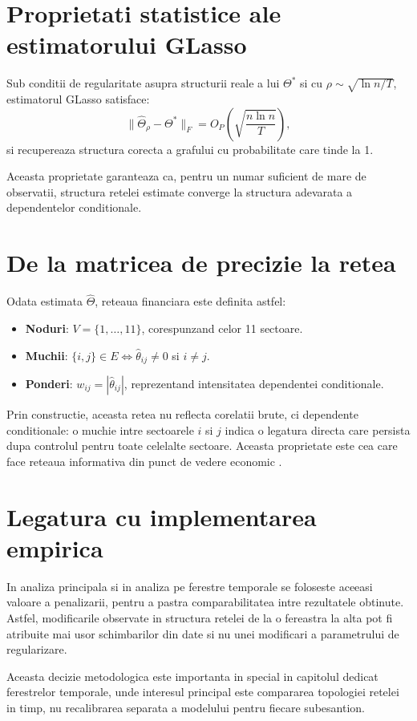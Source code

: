 \section{Proprietati statistice ale estimatorului GLasso}

\begin{proposition}
Sub conditii de regularitate asupra structurii reale a lui $\Theta^*$ si cu
$\rho \sim \sqrt{\ln n / T}$, estimatorul GLasso satisface:
\[
    \|\hat{\Theta}_\rho - \Theta^*\|_F = O_P\!\left(\sqrt{\frac{n \ln n}{T}}\right),
\]
si recupereaza structura corecta a grafului cu probabilitate care tinde la 1.
\end{proposition}

Aceasta proprietate garanteaza ca, pentru un numar suficient de mare de
observatii, structura retelei estimate converge la structura adevarata a
dependentelor conditionale.

\section{De la matricea de precizie la retea}

Odata estimata $\hat{\Theta}$, reteaua financiara este definita astfel:
\begin{itemize}
    \item \textbf{Noduri}: $V = \{1, \ldots, 11\}$, corespunzand celor 11 sectoare.
    \item \textbf{Muchii}: $\{i,j\} \in E \iff \hat{\theta}_{ij} \neq 0$ si $i \neq j$.
    \item \textbf{Ponderi}: $w_{ij} = |\hat{\theta}_{ij}|$, reprezentand intensitatea
    dependentei conditionale.
\end{itemize}

Prin constructie, aceasta retea nu reflecta corelatii brute, ci dependente
conditionale: o muchie intre sectoarele $i$ si $j$ indica o legatura directa
care persista dupa controlul pentru toate celelalte sectoare. Aceasta proprietate
este cea care face reteaua informativa din punct de vedere economic
\citep{lauritzen1996,friedman2008}.


\section{Legatura cu implementarea empirica}

In analiza principala si in analiza pe ferestre temporale se foloseste aceeasi
valoare a penalizarii, pentru a pastra comparabilitatea intre rezultatele
obtinute. Astfel, modificarile observate in structura retelei de la o fereastra
la alta pot fi atribuite mai usor schimbarilor din date si nu unei modificari
a parametrului de regularizare.

Aceasta decizie metodologica este importanta in special in capitolul dedicat
ferestrelor temporale, unde interesul principal este compararea topologiei
retelei in timp, nu recalibrarea separata a modelului pentru fiecare subesantion.